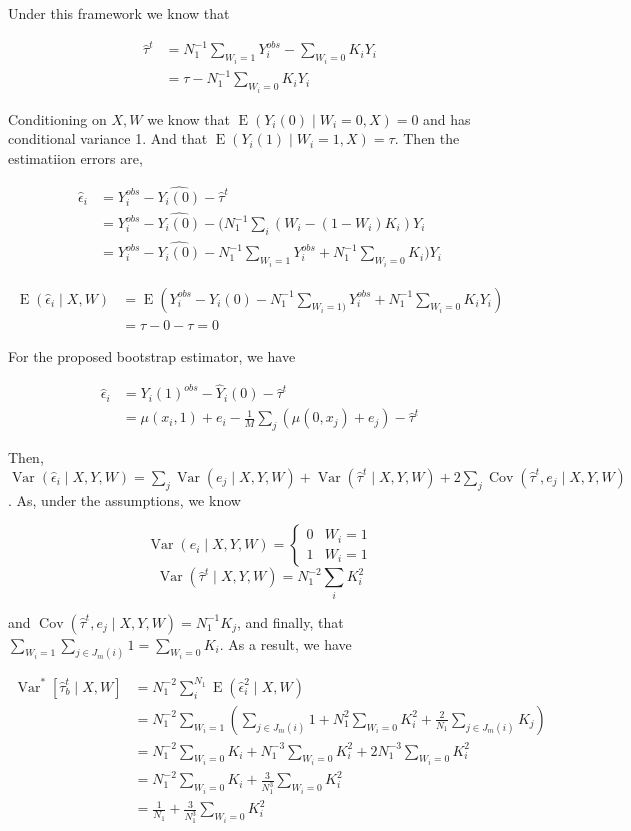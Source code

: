 \documentclass{article}
\DeclareMathOperator{\E}{E}
\DeclareMathOperator{\Var}{Var}
\DeclareMathOperator{\Cov}{Cov}
\newcommand{\hta}{\hat \tau^{t}}
\newcommand{\he}{\hat{\epsilon}_{i}}
\newcommand{\Yi}{Y_{i}^{obs}}
\newcommand{\hYi}{\hat{Y_{i}(0)}}
\begin{document}
Under this framework we know that

\begin{align} \hat \tau^{t} &= N_{1}^{-1}\sum_{W_{i} = 1}Y_{i}^{obs}-\sum_{W_{i} = 0}K_{i}Y_{i} \\
&= \tau -N_{1}^{-1}\sum_{W_{i} = 0}K_{i}Y_{i} \end{align}

Conditioning on $X,W$ we know that $\E(Y_{i}(0) \mid W_{i} = 0, X) = 0$ and has conditional variance 1. And that $\E(Y_{i}(1) \mid W_{i} = 1, X) = \tau$. Then the estimatiion errors are,

\begin{align*} \he &= \Yi - \hYi-\hta \\
&= \Yi - \hYi - (N_{1}^{-1}\sum_{i}(W_{i}-(1-W_{i})K_{i})Y_{i} \\
&= \Yi - \hYi - N_{1}^{-1}\sum_{W_{i} = 1}\Yi+N_{1}^{-1}\sum_{W_{i}=0}K_{i})Y_{i}\end{align*}

\begin{align*}\E(\he \mid X,W) &= \E(\Yi - \hYi - N_{1}^{-1}\sum_{W_{i} =
1)}\Yi+N_{1}^{-1}\sum_{W_{i}=0}K_{i}Y_{i}) \\ &= \tau-0-\tau = 0\end{align*}

For the proposed bootstrap estimator, we have

\begin{align*} \hat \epsilon_{i} &= Y_{i}(1)^{obs}-\hat Y_{i}(0)-\hat \tau^{t} \\
&= \mu(x_{i},1)+e_{i}-\frac{1}{M}\sum_{j}\left(\mu(0,x_{j})+e_{j}\right)-\hat \tau^{t} \end{align*}

Then, $\Var(\he\mid X,Y,W) = \sum_{j}\Var(e_{j}\mid X,Y,W)+\Var(\hat \tau^{t}\mid X,Y,W)+2\sum_{j}\Cov(\hat \tau^{t},e_{j}\mid X,Y,W)$. As, under the assumptions, we know 

$$\Var(e_{i}\mid X,Y,W) = \begin{cases}0 & W_{i} = 1 \\ 1 & W_{i} = 1 \end{cases}$$
$$\Var(\hat \tau^{t} \mid X,Y,W) = N_{1}^{-2}\sum_{i}K_{i}^{2}$$

and $\Cov(\hat \tau^{t},e_{j}\mid X,Y,W) = N_{1}^{-1}K_{j}$, and finally, that $\sum_{W_{i}=1}\sum_{j \in J_{m}(i)}1 = \sum_{W_{i} = 0}K_{i}$. As a result, we have


\begin{align*} \Var^{*}[\hat \tau_{b}^{t} \mid X,W] &= N_{1}^{-2}\sum_{i}^{N_{1}}\E(\he^{2} \mid X,W) \\
&= N_{1}^{-2}\sum_{W_{i}=1}\left(\sum_{j \in J_{m}(i)}1+N_{1}^{2}\sum_{W_{i}=0}K_{i}^{2}+\frac{2}{N_{1}}\sum_{j \in J_{m}(i)}K_{j}\right) \\
&= N_{1}^{-2}\sum_{W_{i}=0}K_{i}+N_{1}^{-3}\sum_{W_{i}=0}K_{i}^{2}+2N_{1}^{-3}\sum_{W_{i}=0}K_{i}^{2} \\
&= N_{1}^{-2}\sum_{W_{i}=0}K_{i}+\frac{3}{N_{1}^{3}}\sum_{W_{i}=0}K_{i}^{2} \\
&= \frac{1}{N_{1}}+\frac{3}{N_{1}^{3}}\sum_{W_{i}=0}K_{i}^{2}\end{align*}
\end{document}
